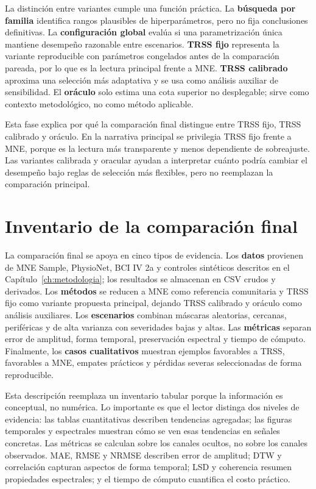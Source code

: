 La distinción entre variantes cumple una función práctica. La \textbf{búsqueda por familia} identifica rangos plausibles de hiperparámetros, pero no fija conclusiones definitivas. La \textbf{configuración global} evalúa si una parametrización única mantiene desempeño razonable entre escenarios. \textbf{TRSS fijo} representa la variante reproducible con parámetros congelados antes de la comparación pareada, por lo que es la lectura principal frente a MNE. \textbf{TRSS calibrado} aproxima una selección más adaptativa y se usa como análisis auxiliar de sensibilidad. El \textbf{oráculo} solo estima una cota superior no desplegable; sirve como contexto metodológico, no como método aplicable.

Esta fase explica por qué la comparación final distingue entre TRSS fijo, TRSS calibrado y oráculo. En la narrativa principal se privilegia TRSS fijo frente a MNE, porque es la lectura más transparente y menos dependiente de sobreajuste. Las variantes calibrada y oracular ayudan a interpretar cuánto podría cambiar el desempeño bajo reglas de selección más flexibles, pero no reemplazan la comparación principal.

\section{Inventario de la comparación final}

La comparación final se apoya en cinco tipos de evidencia. Los \textbf{datos} provienen de MNE Sample, PhysioNet, BCI IV 2a y controles sintéticos descritos en el Capítulo~\ref{ch:metodologia}; los resultados se almacenan en CSV crudos y derivados. Los \textbf{métodos} se reducen a MNE como referencia comunitaria y TRSS fijo como variante propuesta principal, dejando TRSS calibrado y oráculo como análisis auxiliares. Los \textbf{escenarios} combinan máscaras aleatorias, cercanas, periféricas y de alta varianza con severidades bajas y altas. Las \textbf{métricas} separan error de amplitud, forma temporal, preservación espectral y tiempo de cómputo. Finalmente, los \textbf{casos cualitativos} muestran ejemplos favorables a TRSS, favorables a MNE, empates prácticos y pérdidas severas seleccionadas de forma reproducible.

Esta descripción reemplaza un inventario tabular porque la información es conceptual, no numérica. Lo importante es que el lector distinga dos niveles de evidencia: las tablas cuantitativas describen tendencias agregadas; las figuras temporales y espectrales muestran cómo se ven esas tendencias en señales concretas. Las métricas se calculan sobre los canales ocultos, no sobre los canales observados. MAE, RMSE y NRMSE describen error de amplitud; DTW y correlación capturan aspectos de forma temporal; LSD y coherencia resumen propiedades espectrales; y el tiempo de cómputo cuantifica el costo práctico.

